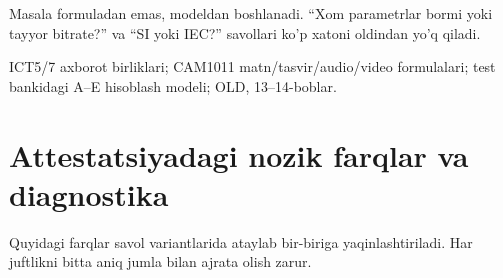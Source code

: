 \documentclass[11pt,a4paper,oneside]{book}
\newcommand{\chapterintro}[1]{\begin{tcolorbox}[colback=Navy,coltext=white,arc=2mm,boxrule=0pt]\sffamily #1\end{tcolorbox}}
\begin{document}
\begin{summarybox}
Masala formuladan emas, modeldan boshlanadi. ``Xom parametrlar bormi yoki tayyor bitrate?'' va ``SI yoki IEC?'' savollari ko'p xatoni oldindan yo'q qiladi.
\end{summarybox}
\begin{sourcebox}
ICT5/7 axborot birliklari; CAM1011 matn/tasvir/audio/video formulalari; test bankidagi A--E hisoblash modeli; OLD, 13--14-boblar.
\end{sourcebox}
\chapter{Attestatsiyadagi nozik farqlar va diagnostika}
\chapterintro{Quyidagi farqlar savol variantlarida ataylab bir-biriga yaqinlashtiriladi. Har juftlikni bitta aniq jumla bilan ajrata olish zarur.}
\end{document}
